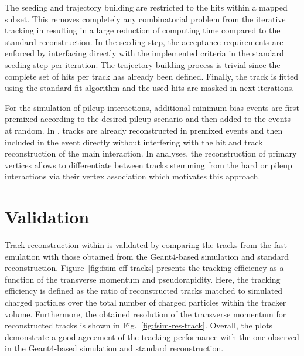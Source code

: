 
The seeding and trajectory building are restricted to the hits within a mapped subset. This removes completely any combinatorial problem from the iterative tracking in \FSIM resulting in a large reduction of computing time compared to the standard reconstruction. In the seeding step, the acceptance requirements are enforced by interfacing directly with the implemented criteria in the standard seeding step per iteration. The trajectory building process is trivial since the complete set of hits per track has already been defined. Finally, the track is fitted using the standard fit algorithm and the used hits are masked in next iterations.

For the simulation of pileup interactions, additional minimum bias events are first premixed according to the desired pileup scenario and then added to the events at random. In \FSIM, tracks are already reconstructed in premixed events and then included in the event directly without interfering with the hit and track reconstruction of the main interaction. In analyses, the reconstruction of primary vertices allows to differentiate between tracks stemming from the hard or pileup interactions via their vertex association which motivates this approach.


\section{Validation}

Track reconstruction within \FSIM is validated by comparing the tracks from the fast emulation with those obtained from the Geant4-based simulation and standard reconstruction. Figure~\ref{fig:fsim-eff-tracks} presents the tracking efficiency as a function of the transverse momentum and pseudorapidity. Here, the tracking efficiency is defined as the ratio of reconstructed tracks matched to simulated charged particles over the total number of charged particles within the tracker volume. Furthermore, the obtained resolution of the transverse momentum for reconstructed tracks is shown in Fig.~\ref{fig:fsim-res-track}. Overall, the plots demonstrate a good agreement of the \FSIM tracking performance with the one observed in the Geant4-based simulation and standard reconstruction.

